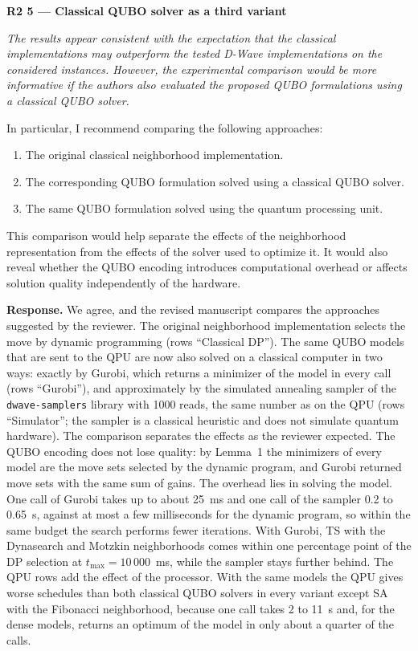 \documentclass[12pt]{article}
\newenvironment{rc}[1]{\par\medskip\noindent\textbf{#1}\par\nopagebreak\noindent\itshape\renewcommand{\emph}[1]{\textbf{##1}}\ignorespaces}{\par}
\newcommand{\answer}[1]{\par\smallskip\noindent\textbf{Response.} #1\par}
\begin{document}
\begin{rc}{R2 5 --- Classical QUBO solver as a third variant}
The results appear consistent with the expectation that the classical implementations may outperform the tested D-Wave implementations on the considered instances. However, the experimental comparison would be more informative if the authors also evaluated the proposed QUBO formulations using a classical QUBO solver.

In particular, I recommend comparing the following approaches:
\begin{enumerate}
\item The original classical neighborhood implementation.
\item The corresponding QUBO formulation solved using a classical QUBO solver.
\item The same QUBO formulation solved using the quantum processing unit.
\end{enumerate}
This comparison would help separate the effects of the neighborhood representation from the effects of the solver used to optimize it. It would also reveal whether the QUBO encoding introduces computational overhead or affects solution quality independently of the hardware.
\end{rc}
\answer{We agree, and the revised manuscript compares the approaches suggested by the reviewer. The original neighborhood implementation selects the move by dynamic programming (rows ``Classical DP''). The same QUBO models that are sent to the QPU are now also solved on a classical computer in two ways: exactly by Gurobi, which returns a minimizer of the model in every call (rows ``Gurobi''), and approximately by the simulated annealing sampler of the \texttt{dwave-samplers} library with 1000 reads, the same number as on the QPU (rows ``Simulator''; the sampler is a classical heuristic and does not simulate quantum hardware). The comparison separates the effects as the reviewer expected. The QUBO encoding does not lose quality: by Lemma~1 the minimizers of every model are the move sets selected by the dynamic program, and Gurobi returned move sets with the same sum of gains. The overhead lies in solving the model. One call of Gurobi takes up to about 25~ms and one call of the sampler 0.2 to 0.65~s, against at most a few milliseconds for the dynamic program, so within the same budget the search performs fewer iterations. With Gurobi, TS with the Dynasearch and Motzkin neighborhoods comes within one percentage point of the DP selection at $t_{\max}=10\,000$~ms, while the sampler stays further behind. The QPU rows add the effect of the processor. With the same models the QPU gives worse schedules than both classical QUBO solvers in every variant except SA with the Fibonacci neighborhood, because one call takes 2 to 11~s and, for the dense models, returns an optimum of the model in only about a quarter of the calls.}
\end{document}
